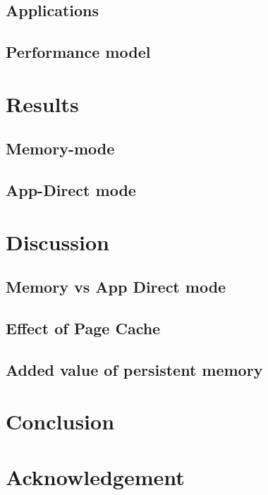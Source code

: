\documentclass[conference]{IEEEtran}
\begin{document}
\subsection{Applications}
\subsection{Performance model}
\section{Results}
\subsection{Memory-mode}
\subsection{App-Direct mode}
\section{Discussion}
\subsection{Memory vs App Direct mode}
\subsection{Effect of Page Cache}
\subsection{Added value of persistent memory}
\section{Conclusion}
\section{Acknowledgement}
 

\end{document}
